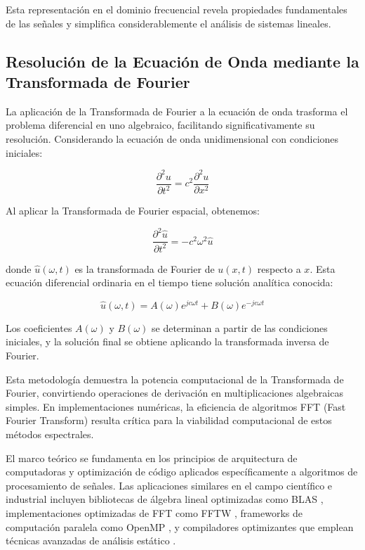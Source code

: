 \documentclass[a4paper]{article}
\begin{document}
Esta representación en el dominio frecuencial revela propiedades fundamentales de las señales y simplifica considerablemente el análisis de sistemas lineales.

\subsection{Resolución de la Ecuación de Onda mediante la Transformada de Fourier}

La aplicación de la Transformada de Fourier a la ecuación de onda trasforma el problema diferencial en uno algebraico, facilitando significativamente su resolución. Considerando la ecuación de onda unidimensional con condiciones iniciales:

\begin{equation}
\frac{\partial^2 u}{\partial t^2} = c^2 \frac{\partial^2 u}{\partial x^2}
\end{equation}

Al aplicar la Transformada de Fourier espacial, obtenemos:

\begin{equation}
\frac{\partial^2 \hat{u}}{\partial t^2} = -c^2 \omega^2 \hat{u}
\end{equation}

donde $\hat{u}(\omega, t)$ es la transformada de Fourier de $u(x,t)$ respecto a $x$. Esta ecuación diferencial ordinaria en el tiempo tiene solución analítica conocida:

\begin{equation}
\hat{u}(\omega, t) = A(\omega) e^{jc\omega t} + B(\omega) e^{-jc\omega t}
\end{equation}

Los coeficientes $A(\omega)$ y $B(\omega)$ se determinan a partir de las condiciones iniciales, y la solución final se obtiene aplicando la transformada inversa de Fourier.

Esta metodología demuestra la potencia computacional de la Transformada de Fourier, convirtiendo operaciones de derivación en multiplicaciones algebraicas simples. En implementaciones numéricas, la eficiencia de algoritmos FFT (Fast Fourier Transform) resulta crítica para la viabilidad computacional de estos métodos espectrales.

El marco teórico se fundamenta en los principios de arquitectura de computadoras y optimización de código aplicados específicamente a algoritmos de procesamiento de señales. Las aplicaciones similares en el campo científico e industrial incluyen bibliotecas de álgebra lineal optimizadas como BLAS \cite{lawson1979basic}, implementaciones optimizadas de FFT como FFTW \cite{frigo2005design}, frameworks de computación paralela como OpenMP \cite{dagum1998openmp}, y compiladores optimizantes que emplean técnicas avanzadas de análisis estático \cite{muchnick1997advanced}.
\end{document}
